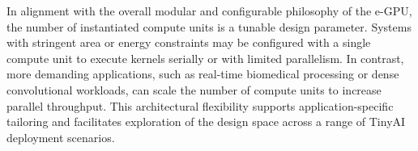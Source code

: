             \begin{table}[tp]
                \caption{Configurability knobs of the presented e-GPU platform.}
                \label{tbl:gpu_knobs}
                \centering
            \end{table}
            
            In alignment with the overall modular and configurable philosophy of the \mbox{e-GPU}, the number of instantiated compute units is a tunable design parameter. Systems with stringent area or energy constraints may be configured with a single compute unit to execute kernels serially or with limited parallelism. In contrast, more demanding applications, such as real-time biomedical processing or dense convolutional workloads, can scale the number of compute units to increase parallel throughput. This architectural flexibility supports application-specific tailoring and facilitates exploration of the design space across a range of TinyAI deployment scenarios.

